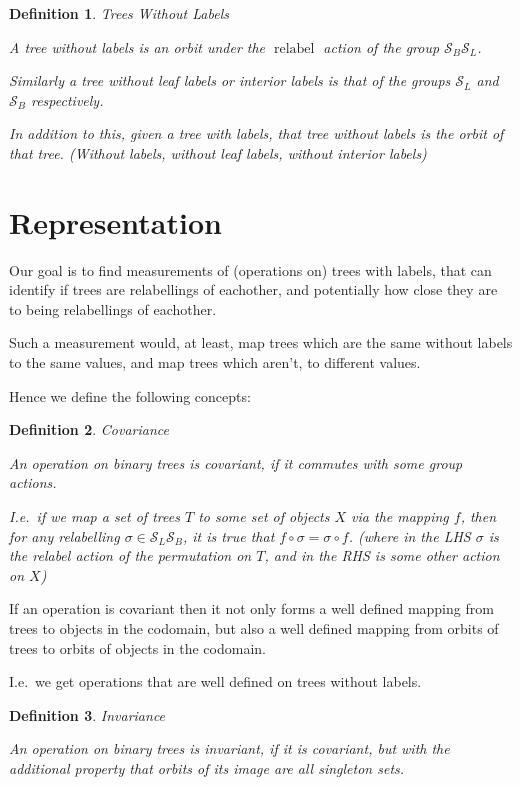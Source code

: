 \documentclass[10pt,a4paper]{report}
\DeclareMathOperator{\relabel}{relabel}
\newcommand{\S}{\mathcal{S}}
\newtheorem{definition}{Definition}
\begin{document}
\begin{definition} Trees Without Labels

	A tree without labels is an orbit under the $\relabel$ action of the group ${\S_B}{\S_L}$.

	Similarly a tree without leaf labels or interior labels is that of the groups $\S_L$ and $\S_B$ respectively.

	In addition to this, given a tree with labels, \emph{that} tree without labels is the orbit of that tree. (Without labels, without leaf labels, without interior labels)
\end{definition}

\section{Representation}

Our goal is to find measurements of (operations on) trees with labels, that can identify if trees are
relabellings of eachother, and potentially how close they are to being
relabellings of eachother.

Such a measurement would, at least, map trees which are the same without labels to the
same values, and map trees which aren't, to different values.

Hence we define the following concepts:

\begin{definition} Covariance

	An operation on binary trees is covariant, if it commutes with some group actions.

	I.e.\ if we map a set of trees $T$ to some set of objects $X$ via the
	mapping $f$, then for any relabelling $\sigma \in \S_L\S_B$, it is true
	that $f \circ \sigma = \sigma \circ f$. (where in the LHS $\sigma$ is the
	relabel action of the permutation on $T$, and in the RHS is some other action on $X$)
\end{definition}

If an operation is covariant then it not only forms a well defined mapping from
trees to objects in the codomain, but also a well defined mapping
from orbits of trees to orbits of objects in the codomain.

I.e.\ we get operations that are well defined on trees without labels.

\begin{definition} Invariance

	An operation on binary trees is invariant, if it is covariant, but with the
	additional property that orbits of its image are all singleton sets.
\end{definition}
\end{document}
